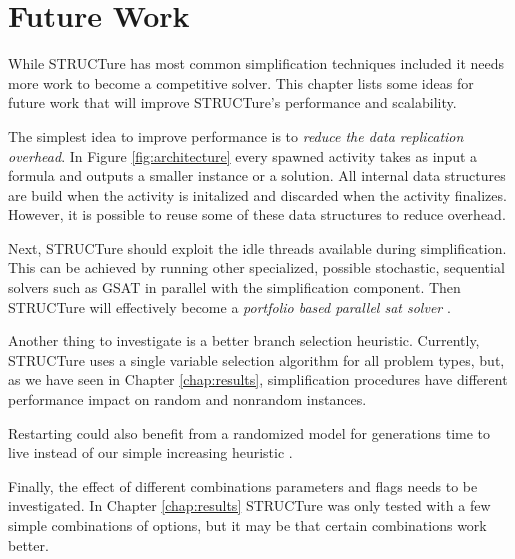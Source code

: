 \chapter{Future Work}
\label{chap:future}

While STRUCTure has most common simplification techniques included
it needs more work to become a competitive solver. This chapter
lists some ideas for future work that will improve STRUCTure's
performance and scalability.

The simplest idea to improve performance is to \emph{reduce the data
replication overhead}. In Figure \ref{fig:architecture} every spawned
activity takes as input a formula and outputs a smaller instance or a
solution. All internal data structures are build when the activity is
initalized and discarded when the activity finalizes. However, it is
possible to reuse some of these data structures to reduce overhead.

Next, STRUCTure should exploit the idle threads available
during simplification. This can be achieved by running other
specialized, possible stochastic, sequential solvers such as GSAT
\cite{Selman92anew} in parallel with the simplification component.
Then STRUCTure will effectively become a \emph{portfolio based
parallel sat solver} \cite{5547119}.

Another thing to investigate is a better branch selection
heuristic.  Currently, STRUCTure uses a single variable selection
algorithm for all problem types, but, as we
have seen in Chapter \ref{chap:results}, simplification procedures
have different performance impact on random and nonrandom instances.

Restarting could also benefit from a randomized model for
generations time to live instead of our simple increasing heuristic
\cite{Gomes:1998:BCS:295240.295710}.

Finally, the effect of different combinations parameters and flags
needs to be investigated. In Chapter \ref{chap:results} STRUCTure
was only tested with a few simple combinations of options, but it
may be that certain combinations work better.
